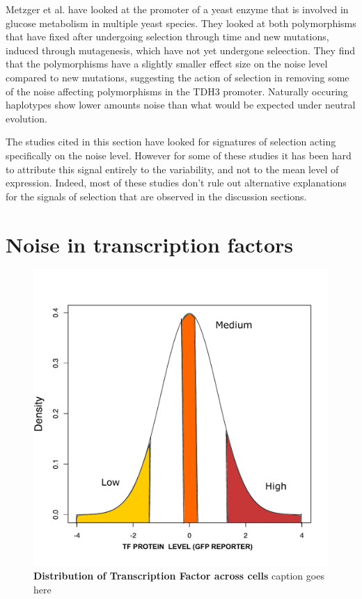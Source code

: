 Metzger et al. \cite{Metzger} have looked at the promoter of a yeast enzyme that is involved in glucose metabolism in multiple yeast species. They looked at both polymorphisms that have fixed after undergoing selection through time and new mutations, induced through mutagenesis, which have not yet undergone seleection. They find that the polymorphisms have a slightly smaller effect size on the noise level compared to new mutations, suggesting the action of selection in removing some of the noise affecting polymorphisms in the TDH3 promoter. Naturally occuring haplotypes show lower amounts noise than what would be expected under neutral evolution.

The studies cited in this section have looked for signatures of selection acting specifically on the noise level. However for some of these studies it has been hard to attribute this signal entirely to the variability, and not to the mean level of expression. Indeed, most of these studies don't rule out alternative explanations for the signals of selection that are observed in the discussion sections.

\section{Noise in transcription factors}

\begin{figure}[t!]  
    \centering
    \includegraphics[width=\linewidth, scale=0.25]{figures/intro/intro_gfp_density_X.pdf}
    \caption[Distribution of Transcription Factor across cells.]{%
        \textbf{Distribution of Transcription Factor across cells}
        caption goes here
    }
    \label{fig:intro2}
\end{figure}

